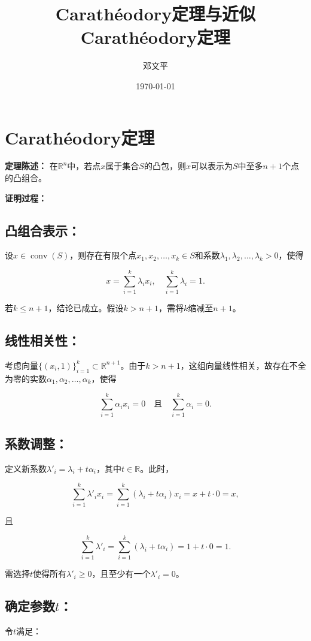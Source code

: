 \documentclass{article}
\title{Carathéodory定理与近似Carathéodory定理}
\author{邓文平}
\date{\today}
\begin{document}
\maketitle

\section{Carathéodory定理}

\textbf{定理陈述：} 在\(\mathbb{R}^n\)中，若点\( x \)属于集合\( S \)的凸包，则\( x \)可以表示为\( S \)中至多\( n+1 \)个点的凸组合。

\textbf{证明过程：}

\subsection{凸组合表示：}
设\( x \in \operatorname{conv}(S) \)，则存在有限个点\( x_1, x_2, \ldots, x_k \in S \)和系数\( \lambda_1, \lambda_2, \ldots, \lambda_k > 0 \)，使得

\[
x = \sum_{i=1}^{k} \lambda_i x_i, \quad \sum_{i=1}^{k} \lambda_i = 1.
\]

若\( k \leq n+1 \)，结论已成立。假设\( k > n+1 \)，需将\( k \)缩减至\( n+1 \)。

\subsection{线性相关性：}
考虑向量\(\{ (x_i, 1) \}_{i=1}^{k} \subset \mathbb{R}^{n+1}\)。由于\( k > n+1 \)，这组向量线性相关，故存在不全为零的实数\( \alpha_1, \alpha_2, \ldots, \alpha_k \)，使得

\[
\sum_{i=1}^{k} \alpha_i x_i = 0 \quad \text{且} \quad \sum_{i=1}^{k} \alpha_i = 0.
\]

\subsection{系数调整：}
定义新系数\( \lambda'_i = \lambda_i + t \alpha_i \)，其中\( t \in \mathbb{R} \)。此时，

\[
\sum_{i=1}^{k} \lambda'_i x_i = \sum_{i=1}^{k} (\lambda_i + t \alpha_i) x_i = x + t \cdot 0 = x,
\]

且

\[
\sum_{i=1}^{k} \lambda'_i = \sum_{i=1}^{k} (\lambda_i + t \alpha_i) = 1 + t \cdot 0 = 1.
\]

需选择\( t \)使得所有\( \lambda'_i \geq 0 \)，且至少有一个\( \lambda'_i = 0 \)。

\subsection{确定参数\( t \)：}
令\( t \)满足：
\end{document}

